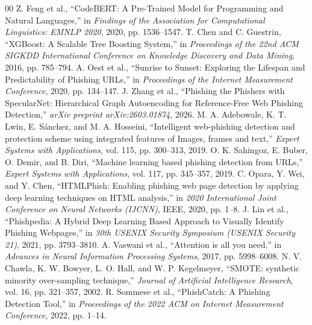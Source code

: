 \documentclass[conference]{IEEEtran}
\begin{document}
\begin{thebibliography}{00}
 Z. Feng et al., ``CodeBERT: A Pre-Trained Model for Programming and Natural Languages,'' in \textit{Findings of the Association for Computational Linguistics: EMNLP 2020}, 2020, pp. 1536–1547.
 T. Chen and C. Guestrin, ``XGBoost: A Scalable Tree Boosting System,'' in \textit{Proceedings of the 22nd ACM SIGKDD International Conference on Knowledge Discovery and Data Mining}, 2016, pp. 785–794.
 A. Oest et al., ``Sunrise to Sunset: Exploring the Lifespan and Predictability of Phishing URLs,'' in \textit{Proceedings of the Internet Measurement Conference}, 2020, pp. 134–147.
 J. Zhang et al., ``Phishing the Phishers with SpecularNet: Hierarchical Graph Autoencoding for Reference-Free Web Phishing Detection,'' \textit{arXiv preprint arXiv:2603.01874}, 2026.
 M. A. Adebowale, K. T. Lwin, E. Sánchez, and M. A. Hosseini, ``Intelligent web-phishing detection and protection scheme using integrated features of Images, frames and text,'' \textit{Expert Systems with Applications}, vol. 115, pp. 300–313, 2019.
 O. K. Sahingoz, E. Buber, O. Demir, and B. Diri, ``Machine learning based phishing detection from URLs,'' \textit{Expert Systems with Applications}, vol. 117, pp. 345–357, 2019.
 C. Opara, Y. Wei, and Y. Chen, ``HTMLPhish: Enabling phishing web page detection by applying deep learning techniques on HTML analysis,'' in \textit{2020 International Joint Conference on Neural Networks (IJCNN)}, IEEE, 2020, pp. 1–8.
 J. Lin et al., ``Phishpedia: A Hybrid Deep Learning Based Approach to Visually Identify Phishing Webpages,'' in \textit{30th USENIX Security Symposium (USENIX Security 21)}, 2021, pp. 3793–3810.
 A. Vaswani et al., ``Attention is all you need,'' in \textit{Advances in Neural Information Processing Systems}, 2017, pp. 5998–6008.
 N. V. Chawla, K. W. Bowyer, L. O. Hall, and W. P. Kegelmeyer, ``SMOTE: synthetic minority over-sampling technique,'' \textit{Journal of Artificial Intelligence Research}, vol. 16, pp. 321–357, 2002.
 R. Sommese et al., ``PhishCatch: A Phishing Detection Tool,'' in \textit{Proceedings of the 2022 ACM on Internet Measurement Conference}, 2022, pp. 1–14.
\end{thebibliography}
\end{document}
